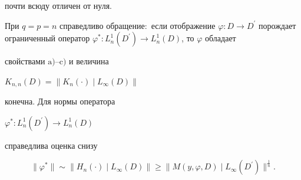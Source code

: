 \begin{thm}
\begin{itemize}
почти всюду отличен от нуля.


\end{itemize}





При $q=p=n$ справедливо обращение\/$:$ если отображение $\varphi :


D\to D^{\prime}$ порождает ограниченный оператор $\varphi^{*}


:L_{n}^{1}(D^{\prime})\to L_{n}^{1}(D)$, то $\varphi$ обладает


свойствами $\mathrm{a)}$--$\mathrm{c)}$ и величина


$K_{n,n}(D)=\|K_n(\cdot)\mid L_{\infty}(D)\|$


конечна. Для нормы оператора


$\varphi^{*}:L_{n}^{1}(D^{\prime})\to L_{n}^{1}(D)$


справедлива оценка снизу


$$


\|\varphi^*\|\sim\|H_n(\cdot)\mid L_{\infty}(D)\bigr\|\geq


\|M(y,\varphi,D)\mid L_{\infty}(D^{\prime})\|^{\frac{1}{n}}.


$$


\end{thm}





